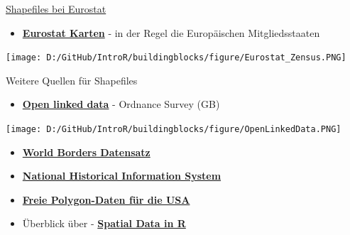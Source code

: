 \documentclass[ignorenonframetext,]{beamer}
\providecommand{\tightlist}{%
  \setlength{\itemsep}{0pt}\setlength{\parskip}{0pt}}
\begin{document}
\begin{frame}{\href{http://ec.europa.eu/eurostat/de/web/gisco/geodata/reference-data/administrative-units-statistical-units}{Shapefiles
bei Eurostat}}
\protect\hypertarget{shapefiles-bei-eurostat}{}

\begin{itemize}
\tightlist
\item
  \href{http://epp.eurostat.ec.europa.eu/portal/page/portal/gisco_Geographical_information_maps/popups/\%20references/administrative_units_statistical_units_1}{\textbf{Eurostat
  Karten}} - in der Regel die Europäischen Mitgliedsstaaten
\end{itemize}

\texttt{[image: D:/GitHub/IntroR/buildingblocks/figure/Eurostat\_Zensus.PNG]}

\end{frame}

\begin{frame}{Weitere Quellen für Shapefiles}
\protect\hypertarget{weitere-quellen-fur-shapefiles}{}

\begin{itemize}
\tightlist
\item
  \href{https://www.ordnancesurvey.co.uk/business-and-government/products/opendata-products-grid.html}{\textbf{Open
  linked data}} - Ordnance Survey (GB)
\end{itemize}

\texttt{[image: D:/GitHub/IntroR/buildingblocks/figure/OpenLinkedData.PNG]}

\begin{itemize}
\item
  \href{http://thematicmapping.org/downloads/world_borders.php}{\textbf{World
  Borders Datensatz}}
\item
  \href{https://www.nhgis.org/}{\textbf{National Historical Information
  System}}
\item
  \href{http://www.freemapdata.com/html/free_polygon_data.html}{\textbf{Freie
  Polygon-Daten für die USA}}
\item
  Überblick über -
  \href{https://science.nature.nps.gov/im/datamgmt/statistics/r/advanced/spatial.cfm}{\textbf{Spatial
  Data in R}}
\end{itemize}

\end{frame}
\end{document}
